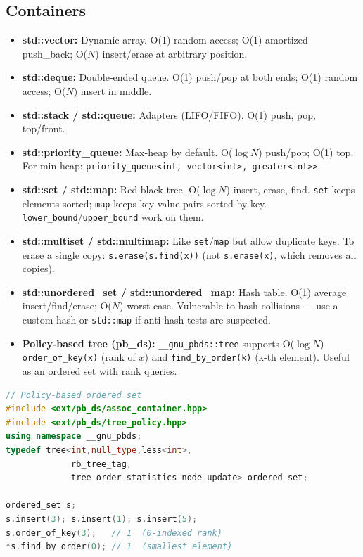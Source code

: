 \subsection{Containers}

\begin{itemize}
    \item \textbf{std::vector: } Dynamic array. O(1) random access; O(1) amortized push\_back; O($N$) insert/erase at arbitrary position.
    \item \textbf{std::deque: } Double-ended queue. O(1) push/pop at both ends; O(1) random access; O($N$) insert in middle.
    \item \textbf{std::stack / std::queue: } Adapters (LIFO/FIFO). O(1) push, pop, top/front.
    \item \textbf{std::priority\_queue: } Max-heap by default. O($\log N$) push/pop; O(1) top. For min-heap: \texttt{priority\_queue<int, vector<int>, greater<int>>}.
    \item \textbf{std::set / std::map: } Red-black tree. O($\log N$) insert, erase, find. \texttt{set} keeps elements sorted; \texttt{map} keeps key-value pairs sorted by key. \texttt{lower\_bound}/\texttt{upper\_bound} work on them.
    \item \textbf{std::multiset / std::multimap: } Like \texttt{set}/\texttt{map} but allow duplicate keys. To erase a single copy: \texttt{s.erase(s.find(x))} (not \texttt{s.erase(x)}, which removes all copies).
    \item \textbf{std::unordered\_set / std::unordered\_map: } Hash table. O(1) average insert/find/erase; O($N$) worst case. Vulnerable to hash collisions — use a custom hash or \texttt{std::map} if anti-hash tests are suspected.
    \item \textbf{Policy-based tree (pb\_ds): } \texttt{\_\_gnu\_pbds::tree} supports O($\log N$) \texttt{order\_of\_key(x)} (rank of $x$) and \texttt{find\_by\_order(k)} (k-th element). Useful as an ordered set with rank queries.
\end{itemize}

\begin{lstlisting}[language=C++]
// Policy-based ordered set
#include <ext/pb_ds/assoc_container.hpp>
#include <ext/pb_ds/tree_policy.hpp>
using namespace __gnu_pbds;
typedef tree<int,null_type,less<int>,
             rb_tree_tag,
             tree_order_statistics_node_update> ordered_set;

ordered_set s;
s.insert(3); s.insert(1); s.insert(5);
s.order_of_key(3);   // 1  (0-indexed rank)
*s.find_by_order(0); // 1  (smallest element)
\end{lstlisting}
